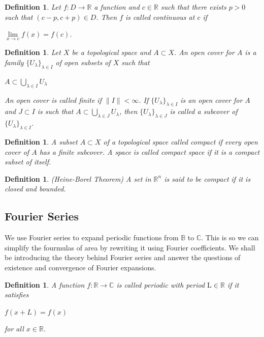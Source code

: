 \documentclass[a4paper]{book}
\newtheorem{definition}[theorem]{Definition}%
\numberwithin{theorem}{section}%
\begin{document}
\begin{definition}
	Let $f:D\to\mathbb{R}$ a function and $c\in\mathbb{R}$ such that there exists $p>0$ such that $(c-p,c+p)\in D$. Then $f$ is called \textit{continuous} at $c$ if
	\begin{center}
		$\underset{x\to c}{\lim}f(x)=f(c)$.
	\end{center}
\end{definition}

\begin{definition}
    Let $X$ be a topological space and $A \subset X$. An open cover for $A$ is a family $\{U_\lambda\}_{\lambda\in I}$ of open subsets of $X$ such that
    \begin{center}
        $A \subset\underset{\lambda\in I}{\bigcup}{U_\lambda}$
    \end{center}
    An open cover is called finite if $\|I\|<\infty$. If $\{U_\lambda\}_{\lambda\in I}$ is an open cover for $A$ and $J \subset I$ is such that $A\subset\underset{\lambda\in J}{\bigcup}{U_\lambda}$, then $\{U_\lambda\}_{\lambda\in J}$ is called a subcover of $\{U_\lambda\}_{\lambda\in I}$.
\end{definition}

\begin{definition}
    A subset $A \subset X$ of a topological space called compact if every open cover of $A$ has a finite subcover. A space is called compact space if it is a compact subset of itself.
\end{definition}

\begin{definition} (Heine-Borel Theorem)
    A set in $\mathbb{R}^n$ is said to be compact if it is closed and bounded.
\end{definition}

\newpage
\subsection{Fourier Series}
We use Fourier series to expand periodic functions from $\mathbb{B}$ to $\mathbb{C}$. This is so we can simplify the fourmulas of area by rewriting it using Fourier coefficients. We shall be introducing the theory behind Fourier series and answer the questions of existence and convergence of Fourier expansions.

\begin{definition}
    A function $f:\mathbb{R}\to\mathbb{C}$ is called \textit{periodic} with period $\mathrm{L}\in\mathbb{R}$ if it satisfies
    \begin{center}
        $f(x+L)=f(x)$
    \end{center}
    for all $x\in\mathbb{R}$.
\end{definition}
\end{document}
